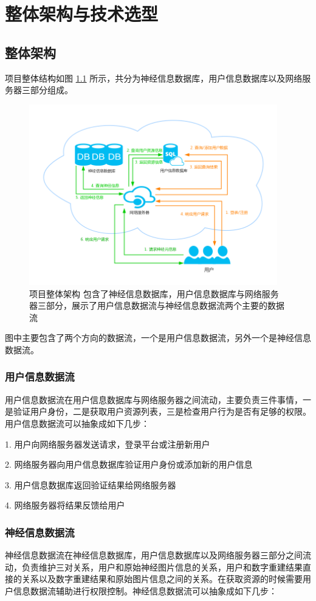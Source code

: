\chapter{整体架构与技术选型}

\section{整体架构}
项目整体结构如图 \ref{server} 所示，共分为神经信息数据库，用户信息数据库以及网络服务器三部分组成。
\begin{figure}[!ht]
\centering
\includegraphics[width=108mm]{images/server}
\caption{项目整体架构 包含了神经信息数据库，用户信息数据库与网络服务器三部分，展示了用户信息数据流与神经信息数据流两个主要的数据流}
\label{server}
\end{figure}
图中主要包含了两个方向的数据流，一个是用户信息数据流，另外一个是神经信息数据流。

\subsection{用户信息数据流}
用户信息数据流在用户信息数据库与网络服务器之间流动，主要负责三件事情，一是验证用户身份，二是获取用户资源列表，三是检查用户行为是否有足够的权限。用户信息数据流可以抽象成如下几步：

1. 用户向网络服务器发送请求，登录平台或注册新用户

2. 网络服务器向用户信息数据库验证用户身份或添加新的用户信息

3. 用户信息数据库返回验证结果给网络服务器

4. 网络服务器将结果反馈给用户

\subsection{神经信息数据流}
神经信息数据流在神经信息数据库，用户信息数据库以及网络服务器三部分之间流动，负责维护三对关系，用户和原始神经图片信息的关系，用户和数字重建结果直接的关系以及数字重建结果和原始图片信息之间的关系。在获取资源的时候需要用户信息数据流辅助进行权限控制。神经信息数据流可以抽象成如下几步：

